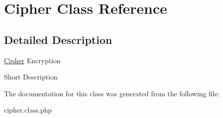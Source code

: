 \hypertarget{class_w_a_f_f_l_e_1_1_framework_1_1_encryption_1_1_cipher}{}\section{Cipher Class Reference}
\label{class_w_a_f_f_l_e_1_1_framework_1_1_encryption_1_1_cipher}


\subsection{Detailed Description}
\hyperlink{class_w_a_f_f_l_e_1_1_framework_1_1_encryption_1_1_cipher}{Cipher} Encryption

Short Description 

The documentation for this class was generated from the following file\+:\begin{DoxyCompactItemize}
\item 
cipher.\+class.\+php\end{DoxyCompactItemize}
